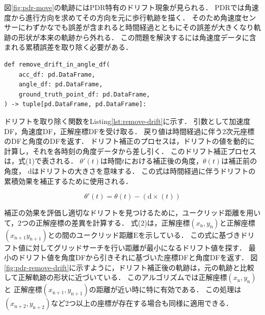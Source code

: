 


図\ref{fig:pdr-move}の軌跡にはPDR特有のドリフト現象が見られる．
PDRでは角速度から進行方向を求めてその方向を元に歩行軌跡を描く．
そのため角速度センサーにわずかなでも誤差が含まれると時間経過とともにその誤差が大きくなり軌跡の形状が本来の軌跡から外れる．
この問題を解決するには角速度データに含まれる累積誤差を取り除く必要がある．


\begin{lstlisting}[caption={ドリフト除去}, label=lst:remove-drift]
def remove_drift_in_angle_df(
    acc_df: pd.DataFrame,
    angle_df: pd.DataFrame,
    ground_truth_point_df: pd.DataFrame,
) -> tuple[pd.DataFrame, pd.DataFrame]:
\end{lstlisting}

ドリフトを取り除く関数をListing\ref{lst:remove-drift}に示す．
引数として加速度DF，角速度DF，正解座標DFを受け取る．
戻り値は時間経過に伴う2次元座標のDFと角度のDFを返す．
ドリフト補正のプロセスは，ドリフトの値を動的に計算し，それを各時刻の角度データから差し引く．
このドリフト補正プロセスは，式(1)で表される．
$\theta'(t)$は時間$t$における補正後の角度，$\theta(t)$は補正前の角度，
$\mathrm{d}$はドリフトの大きさを意味する．
この式は時間経過に伴うドリフトの累積効果を補正するために使用される．


\vspace{5mm} %
\begin{equation}
	\theta'(t) = \theta(t) - (\mathrm{d} \times (t))
\end{equation}

\vspace{5mm} %

補正の効果を評価し適切なドリフトを見つけるために，ユークリッド距離を用いて，2つの正解座標の差異を計算する．
式(2)は，正解座標$(x_{\mathrm{n}}, y_{\mathrm{n}})$と正解座標$(x_{\mathrm{n+1}}
	y_{\mathrm{n+1}})$との間のユークリッド距離$\mathrm{E}$を示している．
この式に基づきドリフト値に対してグリッドサーチを行い距離が最小になるドリフト値を探す．
最小のドリフト値を角度DFから引きそれに基づいた座標DFと角度DFを返す．
図\ref{fig:pdr-remove-drift}に示すように，ドリフト補正後の軌跡は，元の軌跡と比較して正解軌跡の形状に近づいている．
このアルゴリズムでは正解座標$(x_{\mathrm{n}}, y_{\mathrm{n}})$と
正解座標$(x_{\mathrm{n+1}}, y_{\mathrm{n+1}})$の距離が近い時に特に有効である．
この処理は$(x_{\mathrm{n+2}}, y_{\mathrm{n+2}})$など2つ以上の座標が存在する場合も同様に適用できる．

